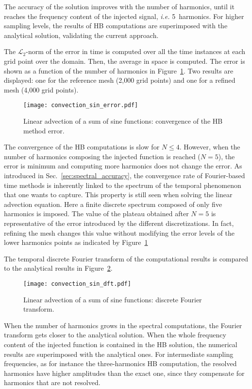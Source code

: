 The accuracy of the solution 
improves with the number of harmonics,
until it reaches the frequency content
of the injected signal, \emph{i.e.} 5~harmonics.
For higher sampling levels, the results of HB computations are
superimposed with the analytical solution, validating the current approach.

The $\mathcal{L}_2$-norm of the error 
in time is computed over all the time instances
at each grid point over the domain.
Then, the average in space is computed.
The error is shown as a function of the number of harmonics
in Figure~\ref{fig:conv_sum_sine}. Two results are displayed:
one for the reference mesh (2,000 grid points) and one for
a refined mesh (4,000 grid points).
\begin{figure}[htp]
  \centering
  \texttt{[image: convection\_sin\_error.pdf]}
  \caption{Linear advection of a sum of sine functions: convergence of the HB method error.}
  \label{fig:conv_sum_sine}
\end{figure}
The convergence of the HB computations is slow  for
$N \leq 4$. However, when the number of harmonics composing
the injected function is reached ($N=5$), the error is minimum and computing
more harmonics does not change the error. As introduced in 
Sec.~\ref{sec:spectral_accuracy},
the convergence rate 
of Fourier-based time methods is inherently linked to the spectrum of the
temporal phenomenon that one wants to capture. This property is still
seen when solving the linear advection equation.
Here a finite discrete spectrum composed of only five harmonics
is imposed.
The value of the plateau obtained 
after $N=5$ is representative of the error introduced by the different
discretizations. In fact, refining the mesh changes this value
without modifying the error levels of the lower harmonics points
as indicated by Figure~\ref{fig:conv_sum_sine}

The temporal discrete Fourier transform
of the computational results is compared to the
analytical results in Figure~\ref{fig:dft_sin}.
\begin{figure}[htp]
  \centering
  \texttt{[image: convection\_sin\_dft.pdf]}
  \caption{Linear advection of a sum of sine functions: 
  discrete Fourier transform.}
  \label{fig:dft_sin}
\end{figure}
When the number of harmonics grows in the spectral computations,
the Fourier transform gets closer to the analytical solution.
When the whole frequency content of the injected 
function is contained in the HB solution, 
the numerical results are superimposed with the analytical ones.
For intermediate sampling frequencies, as for 
instance the three-harmonics HB computation, 
the resolved harmonics have higher amplitudes 
than the exact one, since they compensate for harmonics that are not resolved.

